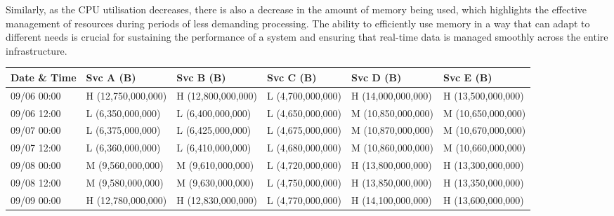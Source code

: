 \documentclass[review]{elsarticle}
\begin{document}
Similarly, as the CPU utilisation decreases, there is also a decrease in the amount of memory being used, which highlights the effective management of resources during periods of less demanding processing. The ability to efficiently use memory in a way that can adapt to different needs is crucial for sustaining the performance of a system and ensuring that real-time data is managed smoothly across the entire infrastructure.

\begin{table}

  \centering

  \scriptsize %

  \setlength{\tabcolsep}{10pt} %

  \begin{tabular}{|l|l|l|l|l|l|}

  \hline

  \textbf{Date \& Time} & \textbf{Svc A (B)} & \textbf{Svc B (B)} & \textbf{Svc C (B)} & \textbf{Svc D (B)} & \textbf{Svc E (B)} \\ \hline

  09/06 00:00 & H (12,750,000,000) & H (12,800,000,000) & L (4,700,000,000) & H (14,000,000,000) & H (13,500,000,000) \\ \hline

  09/06 12:00 & L (6,350,000,000)  & L (6,400,000,000)  & L (4,650,000,000) & M (10,850,000,000) & M (10,650,000,000) \\ \hline

  09/07 00:00 & L (6,375,000,000)  & L (6,425,000,000)  & L (4,675,000,000) & M (10,870,000,000) & M (10,670,000,000) \\ \hline

  09/07 12:00 & L (6,360,000,000)  & L (6,410,000,000)  & L (4,680,000,000) & M (10,860,000,000) & M (10,660,000,000) \\ \hline

  09/08 00:00 & M (9,560,000,000)  & M (9,610,000,000)  & L (4,720,000,000) & H (13,800,000,000) & H (13,300,000,000) \\ \hline

  09/08 12:00 & M (9,580,000,000)  & M (9,630,000,000)  & L (4,750,000,000) & H (13,850,000,000) & H (13,350,000,000) \\ \hline

  09/09 00:00 & H (12,780,000,000) & H (12,830,000,000) & L (4,770,000,000) & H (14,100,000,000) & H (13,600,000,000) \\ \hline


\end{tabular}
\end{table}
\end{document}
